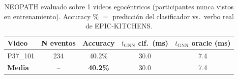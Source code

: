 \begin{table}[t]
\centering\small
\caption{NEOPATH evaluado sobre 1 videos egocéntricos
(participantes nunca vistos en entrenamiento). Accuracy \%
$=$ predicción del clasificador vs.\ verbo real de EPIC-KITCHENS.}
\label{tab:multi_video_results}
\begin{tabular}{@{}lcccc@{}}
\toprule
\textbf{Video} & \textbf{N eventos} & \textbf{Accuracy} &
\textbf{$t_{\text{GNN}}$ clf.\ (ms)} & \textbf{$t_{\text{GNN}}$ oracle (ms)} \\
\midrule
    P37\_101 & 234 & 40.2\% & 30.0 & 7.4 \\
\midrule
\textbf{Media} & -- & \textbf{40.2\%} &
30.0 & 7.4 \\
\bottomrule
\end{tabular}
\end{table}
